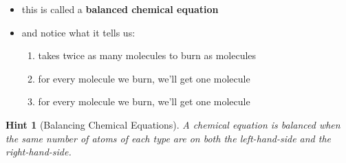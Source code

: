 \documentclass[11pt, oneside]{article}   	%
\newtheorem{hint}{Hint}
\begin{document}
\begin{itemize}
\begin{center}
 \end{center}
\item this is called a \textbf{balanced chemical equation}
\item and notice what it tells us:
\begin{enumerate}
\item {} takes twice as many  molecules to burn as  molecules 
\item for every  molecule we burn, we'll get one  molecule
\item for every  molecule we burn, we'll get one  molecule
\end{enumerate}
\end{itemize}

\begin{hint}[Balancing Chemical Equations]
A chemical equation is balanced when the same number of atoms of each type are on both the left-hand-side and the right-hand-side.
\end{hint}




\nocite{wile-chem-2}
{}

\end{document}
